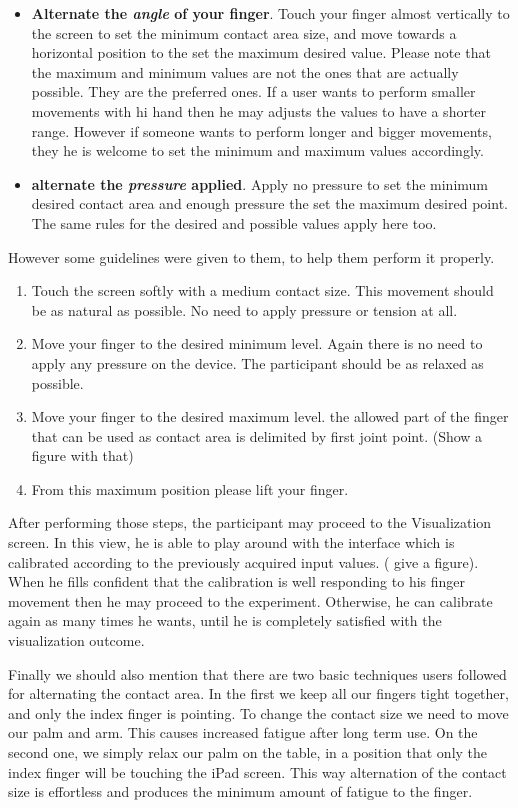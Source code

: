 \begin{itemize}
	\item \textbf{Alternate the \textit{angle} of your finger}. Touch your finger almost vertically to the screen to set the minimum contact area size, and move towards a horizontal position to the set the maximum desired value. Please note that the maximum and minimum values are not the ones that are actually possible. They are the preferred ones. If a user wants to perform smaller movements with hi hand then he may adjusts the values to have a shorter range. However if someone wants to perform longer and bigger movements, they he is welcome to set the minimum and maximum values accordingly.

	\item \textbf{alternate the \textit{pressure} applied}.  Apply no pressure to set the minimum desired contact area and enough pressure the set the maximum desired point. The same rules for the desired and possible values apply here too.
\end{itemize}


However some guidelines were given to them, to help them perform it properly.
\begin{enumerate}
	\item Touch the screen softly with a medium contact size. This movement should be as natural as possible. No need to apply pressure or tension at all.
	\item Move your finger to the desired minimum level. Again there is no need to apply any pressure on the device. The participant should be as relaxed as possible.
	\item Move your finger to the desired maximum level. the allowed part of the finger that can be used as contact area is delimited by first joint point. (Show a figure with that)
	\item From this maximum position please lift your finger. 
\end{enumerate}

After performing those steps, the participant may proceed to the Visualization screen. In this view, he is able to play around with the interface which is calibrated according to the previously acquired input values. ( give a figure). When he fills confident that the calibration is well responding to his finger movement then he may proceed to the experiment. Otherwise, he can calibrate again as many times he wants, until he is completely satisfied with the visualization outcome.

Finally we should also mention that there are two basic techniques users followed for alternating the contact area. In the first we keep all our fingers tight together, and only the index finger is pointing. To change the contact size we need to move our palm and arm. This causes increased fatigue after long term use. On the second one, we simply relax our palm on the table, in a position that only the index finger will be touching the iPad screen. This way alternation of the contact size is effortless and produces the minimum amount of fatigue to the finger.




